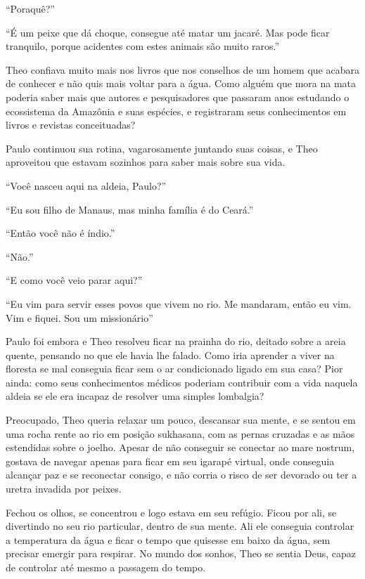 ``Poraquê?''

``É um peixe que dá choque, consegue até matar um jacaré. Mas pode ficar
tranquilo, porque acidentes com estes animais são muito raros.''

Theo confiava muito mais nos livros que nos conselhos de um homem que
acabara de conhecer e não quis mais voltar para a água. Como alguém que
mora na mata poderia saber mais que autores e pesquisadores que passaram
anos estudando o ecossistema da Amazônia e suas espécies, e registraram
seus conhecimentos em livros e revistas conceituadas?

Paulo continuou sua rotina, vagarosamente juntando suas coisas, e Theo
aproveitou que estavam sozinhos para saber mais sobre sua vida.

``Você nasceu aqui na aldeia, Paulo?''

``Eu sou filho de Manaus, mas minha família é do Ceará.''

``Então você não é índio.''

``Não.''

``E como você veio parar aqui?''

``Eu vim para servir esses povos que vivem no rio. Me mandaram, então eu
vim. Vim e fiquei. Sou um missionário''

\asterisc


Paulo foi embora e Theo resolveu ficar na prainha do rio, deitado sobre
a areia quente, pensando no que ele havia lhe falado. Como
iria aprender a viver na floresta se mal conseguia ficar sem o ar
condicionado ligado em sua casa? Pior ainda: como seus conhecimentos
médicos poderiam contribuir com a vida naquela aldeia se ele era incapaz
de resolver uma simples lombalgia?

Preocupado, Theo queria relaxar um pouco, descansar sua mente, e se
sentou em uma rocha rente ao rio em posição sukhasana, com as pernas
cruzadas e as mãos estendidas sobre o joelho. Apesar de não conseguir se
conectar ao mare nostrum, gostava de navegar apenas para ficar em seu
igarapé virtual, onde conseguia alcançar paz e se reconectar consigo, e
não corria o risco de ser devorado ou ter a uretra invadida por peixes.

Fechou os olhos, se concentrou e logo estava em seu refúgio. Ficou por
ali, se divertindo no seu rio particular, dentro de sua mente. Ali ele
conseguia controlar a temperatura da água e ficar o tempo que quisesse
em baixo da água, sem precisar emergir para respirar. No mundo dos
sonhos, Theo se sentia Deus, capaz de controlar até mesmo a passagem do
tempo.

